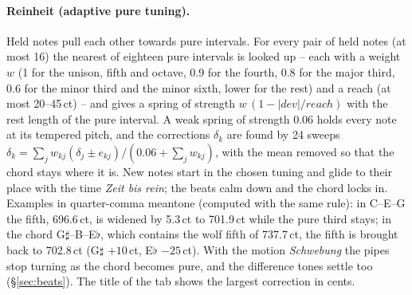 \documentclass[11pt,a4paper,parskip=half,DIV=11,toc=bibliography]{scrartcl}
\newcommand{\ui}[1]{\emph{#1}}                 %
\begin{document}
\paragraph{Reinheit (adaptive pure tuning).} Held notes pull each other towards pure intervals. For every pair of held notes (at
most 16) the nearest of eighteen pure intervals is looked up -- each with a weight $w$ (1 for the unison, fifth and octave, 0.9 for the
fourth, 0.8 for the major third, 0.6 for the minor third and the minor sixth, lower for the rest) and a reach (at most 20--45\,ct) --
and gives a spring of strength $w\,(1-|\mathit{dev}|/\mathit{reach})$ with the rest length of the pure interval. A weak spring of
strength $0.06$ holds every note at its tempered pitch, and the corrections $\delta_k$ are found by 24 sweeps
$\delta_k = \sum_j w_{kj}(\delta_j\pm e_{kj}) / (0.06+\sum_j w_{kj})$, with the mean removed so that the chord stays where it is.
New notes start in the chosen tuning and glide to their place with the time \ui{Zeit bis rein}; the beats calm down and the chord locks
in. Examples in quarter-comma meantone (computed with the same rule): in C--E--G the fifth, 696.6\,ct, is widened by 5.3\,ct to 701.9\,ct
while the pure third stays; in the chord G$\sharp$--B--E$\flat$, which contains the wolf fifth of 737.7\,ct, the fifth is brought back to
702.8\,ct (G$\sharp$ $+10$\,ct, E$\flat$ $-25$\,ct). With the motion \ui{Schwebung} the pipes stop turning as the chord becomes pure, and the
difference tones settle too (\S\ref{sec:beats}). The title of the tab shows the largest correction in cents.
\end{document}
